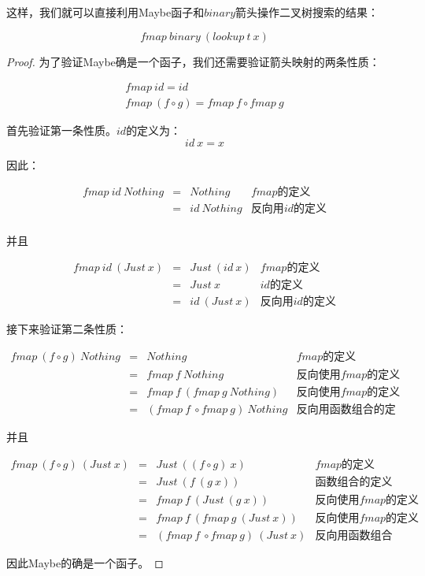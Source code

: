 \documentclass{article}
\begin{document}
\begin{example}
这样，我们就可以直接利用Maybe函子和$binary$箭头操作二叉树搜索的结果：

\[
fmap\ binary\ (lookup\ t\ x)
\]

\begin{proof}
为了验证Maybe确是一个函子，我们还需要验证箭头映射的两条性质：

\[
\begin{array}{l}
fmap\ id = id \\
fmap\ (f \circ g) = fmap\ f \circ fmap\ g
\end{array}
\]

首先验证第一条性质。$id$的定义为：
\[
id\ x = x
\]

因此：

\[
\begin{array}{rcll}
fmap\ id\ Nothing & = & Nothing & \text{$fmap$的定义} \\
                  & = & id\ Nothing & \text{反向用$id$的定义} \\
\end{array}
\]

并且

\[
\begin{array}{rcll}
fmap\ id\ (Just\ x) & = & Just\ (id\ x) & \text{$fmap$的定义} \\
                    & = & Just\ x & \text{$id$的定义} \\
                    & = & id\ (Just\ x) & \text{反向用$id$的定义}
\end{array}
\]

接下来验证第二条性质：

\[
\begin{array}{rcll}
fmap\ (f \circ g)\ Nothing & = & Nothing & \text{$fmap$的定义} \\
           & = & fmap\ f\ Nothing & \text{反向使用$fmap$的定义} \\
           & = & fmap\ f\ (fmap\ g\ Nothing) & \text{反向使用$fmap$的定义} \\
           & = & (fmap\ f\ \circ fmap\ g)\ Nothing & \text{反向用函数组合的定义}
\end{array}
\]

并且

\[
\begin{array}{rcll}
fmap\ (f \circ g)\ (Just\ x) & = & Just\ ((f \circ g)\ x) & \text{$fmap$的定义} \\
           & = & Just\ (f\ (g\ x)) & \text{函数组合的定义} \\
           & = & fmap\ f\ (Just\ (g\ x)) & \text{反向使用$fmap$的定义} \\
           & = & fmap\ f\ (fmap\ g\ (Just\ x)) & \text{反向使用$fmap$的定义} \\
           & = & (fmap\ f\ \circ fmap\ g)\ (Just\ x) & \text{反向用函数组合的定义}
\end{array}
\]

因此Maybe的确是一个函子。
\end{proof}
\end{example}
\end{document}
